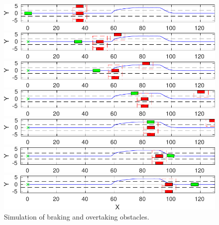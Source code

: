 \begin{figure}[!h]
	\centering
	\begin{minipage}[t]{\textwidth}
		\includegraphics[width=\textwidth]{./figure/three_obstacles_no_overtaking/braking_0.pdf}
	\end{minipage}
	\begin{minipage}[t]{\textwidth}
		\includegraphics[width=\textwidth]{./figure/three_obstacles_no_overtaking/braking_1.pdf}
	\end{minipage}
	\begin{minipage}[t]{\textwidth}
		\includegraphics[width=\textwidth]{./figure/three_obstacles_no_overtaking/braking_2.pdf}
	\end{minipage}
	\begin{minipage}[t]{\textwidth}
		\includegraphics[width=\textwidth]{./figure/three_obstacles_no_overtaking/braking_3.pdf}
	\end{minipage}
	\begin{minipage}[t]{\textwidth}
		\includegraphics[width=\textwidth]{./figure/three_obstacles_no_overtaking/braking_4.pdf}
	\end{minipage}
	\begin{minipage}[t]{\textwidth}
		\includegraphics[width=\textwidth]{./figure/three_obstacles_no_overtaking/braking_5.pdf}
	\end{minipage}
	\begin{minipage}[t]{\textwidth}
		\includegraphics[width=\textwidth]{./figure/three_obstacles_no_overtaking/braking_6.pdf}
	\end{minipage}
	\caption{Simulation of braking and overtaking obstacles.}
	\label{fig:braking}
\end{figure}
